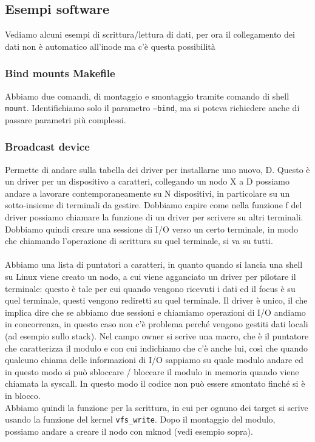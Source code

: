 \documentclass[12pt, oneside]{extbook}
\begin{document}
\subsection*{Esempi software}
Vediamo alcuni esempi di scrittura/lettura di dati, per ora il collegamento dei dati non è automatico all'inode ma c'è questa possibilità
\subsubsection*{Bind mounts Makefile}
Abbiamo due comandi, di montaggio e smontaggio tramite comando di shell \texttt{mount}. Identifichiamo solo il parametro \texttt{--bind}, ma si poteva richiedere anche di passare parametri più complessi.
\subsubsection*{Broadcast device}
Permette di andare sulla tabella dei driver per installarne uno nuovo, D. Questo è un driver per un dispositivo a caratteri, collegando un nodo X a D possiamo andare a lavorare contemporaneamente su N dispositivi, in particolare su un sotto-insieme di terminali da gestire. Dobbiamo capire come nella funzione f del driver possiamo chiamare la funzione di un driver per scrivere su altri terminali. Dobbiamo quindi creare una sessione di I/O verso un certo terminale, in modo che chiamando l'operazione di scrittura su quel terminale, si va su tutti.\\\\Abbiamo una lista di puntatori a caratteri, in quanto quando si lancia una shell su Linux viene creato un nodo, a cui viene agganciato un driver per pilotare il terminale: questo è tale per cui quando vengono ricevuti i dati ed il focus è su quel terminale, questi vengono rediretti su quel terminale. Il driver è unico, il che implica dire che se abbiamo due sessioni e chiamiamo operazioni di I/O andiamo in concorrenza, in questo caso non c'è problema perché vengono gestiti dati locali (ad esempio sullo stack). Nel campo owner si scrive una macro, che è il puntatore che caratterizza il modulo e con cui indichiamo che c'è anche lui, così che quando qualcuno chiama delle informazioni di I/O sappiamo su quale modulo andare ed in questo modo si può sbloccare / bloccare il modulo in memoria quando viene chiamata la syscall. In questo modo il codice non può essere smontato finché si è in blocco.\\Abbiamo quindi la funzione per la scrittura, in cui per ognuno dei target si scrive usando la funzione del kernel \texttt{vfs\_write}. Dopo il montaggio del modulo, possiamo andare a creare il nodo con mknod (vedi esempio sopra).
\end{document}
